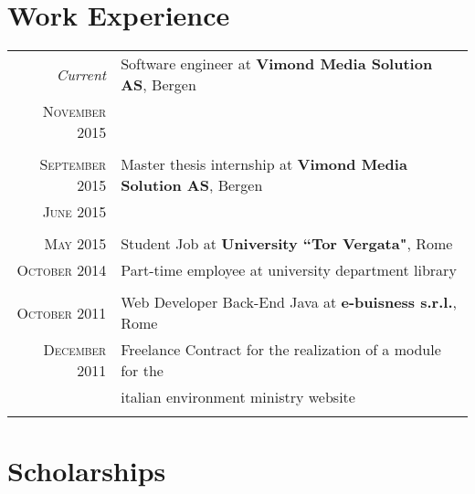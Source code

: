 \documentclass[a4paper,10pt]{article} %
\begin{document}



\section{Work Experience}

\begin{tabular}{r|p{11cm}}

\emph{Current} & Software engineer at \textbf{Vimond Media Solution AS}, Bergen
\\ \textsc{November} 2015   \\
\multicolumn{2}{c}{} \\

\textsc{September} 2015 & Master thesis internship at \textbf{Vimond Media Solution AS}, Bergen
\\ \textsc{June} 2015   \\
\multicolumn{2}{c}{} \\

\textsc{May} 2015 & Student Job at  \textbf{University ``Tor Vergata"}, Rome
\\ \textsc{October} 2014 & Part-time employee at university department library \\
\multicolumn{2}{c}{} \\


\textsc{October} 2011 & Web Developer Back-End Java at  \textbf{e-buisness s.r.l.}, Rome
\\ \textsc{December} 2011 & Freelance Contract  for the realization of a module for the 
\\ &  italian environment ministry website \\
\multicolumn{2}{c}{} \\

\end{tabular}



\section{Scholarships}
\end{document}
